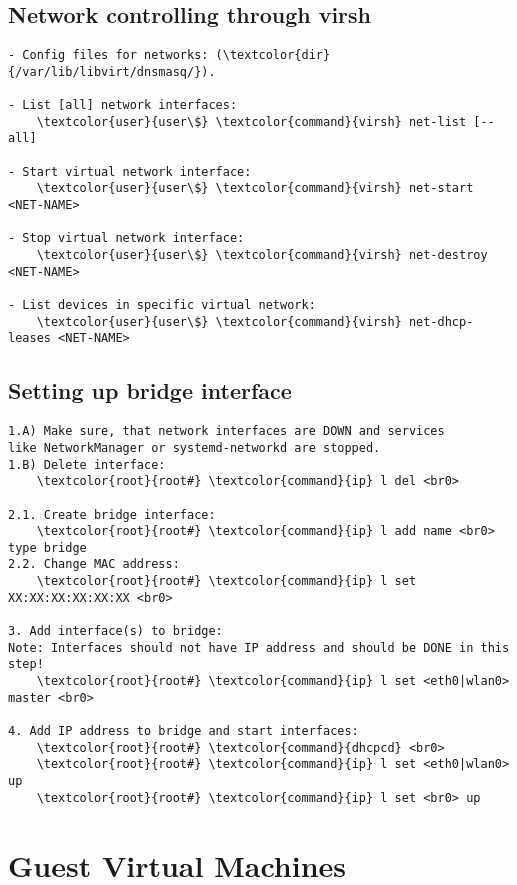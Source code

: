 \documentclass[10pt, a4paper, onecolumn, openany]{book} %
\begin{document}
\subsection{Network controlling through virsh}
\begin{Verbatim}[commandchars=\\\{\}]
- Config files for networks: (\textcolor{dir}{/var/lib/libvirt/dnsmasq/}).

- List [all] network interfaces:
    \textcolor{user}{user\$} \textcolor{command}{virsh} net-list [--all]

- Start virtual network interface:
    \textcolor{user}{user\$} \textcolor{command}{virsh} net-start <NET-NAME>

- Stop virtual network interface:
    \textcolor{user}{user\$} \textcolor{command}{virsh} net-destroy <NET-NAME>
    
- List devices in specific virtual network:
    \textcolor{user}{user\$} \textcolor{command}{virsh} net-dhcp-leases <NET-NAME>
\end{Verbatim}
\subsection{Setting up bridge interface}
\begin{Verbatim}[commandchars=\\\{\}]
1.A) Make sure, that network interfaces are DOWN and services 
like NetworkManager or systemd-networkd are stopped.
1.B) Delete interface:
    \textcolor{root}{root#} \textcolor{command}{ip} l del <br0>

2.1. Create bridge interface:
    \textcolor{root}{root#} \textcolor{command}{ip} l add name <br0> type bridge
2.2. Change MAC address:
    \textcolor{root}{root#} \textcolor{command}{ip} l set XX:XX:XX:XX:XX:XX <br0>

3. Add interface(s) to bridge:
Note: Interfaces should not have IP address and should be DONE in this step!
    \textcolor{root}{root#} \textcolor{command}{ip} l set <eth0|wlan0> master <br0>

4. Add IP address to bridge and start interfaces:
    \textcolor{root}{root#} \textcolor{command}{dhcpcd} <br0>
    \textcolor{root}{root#} \textcolor{command}{ip} l set <eth0|wlan0> up  
    \textcolor{root}{root#} \textcolor{command}{ip} l set <br0> up
\end{Verbatim}

\section{Guest Virtual Machines}
\end{document}
